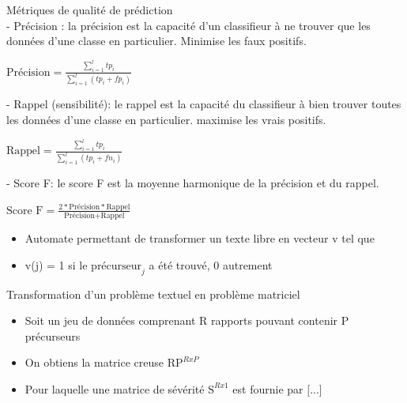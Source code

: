 \begin{frame}	
	
	Métriques de qualité de prédiction\\
	- Précision : la précision est la capacité d'un classifieur à ne trouver que les données d'une classe en particulier. Minimise les faux positifs.	\begin{center}
		$\textrm{Précision} = \frac{\sum_{i=1}^{l} tp_i}{\sum_{i=1}^{l} (tp_i + fp_i)}$
	\end{center}
	
	- Rappel (sensibilité): le rappel est la capacité du classifieur à bien trouver toutes les données d'une classe en particulier. maximise les vrais positifs.
		\begin{center}
		$\textrm{Rappel} = \frac{\sum_{i=1}^{l} tp_i}{\sum_{i=1}^{l} (tp_i + fn_i)}$
	\end{center}
	
	- Score F: le score F est la moyenne harmonique de la précision et du rappel. 
	\begin{center}
		$\textrm{Score F} = \frac{2 * \textrm{Précision} * \textrm{Rappel}}{\textrm{Précision} + \textrm{Rappel}}$ 
	\end{center}
	
\end{frame}







\begin{frame}	
	\begin{itemize}
		\item Automate permettant de transformer un texte libre en vecteur v tel que
		\item v(j) = 1 si le $\textrm{précurseur}_j$ a été trouvé, 0 autrement 
	\end{itemize}

	Transformation d'un problème textuel en problème matriciel
	\begin{itemize}
		\item Soit un jeu de données comprenant R rapports pouvant contenir P précurseurs
		\item On obtiens la matrice creuse $\textrm{RP}^{RxP}$
		\item Pour laquelle une matrice de sévérité $\textrm{S}^{Rx1}$ est fournie par [...]
	\end{itemize}

	
\end{frame}








